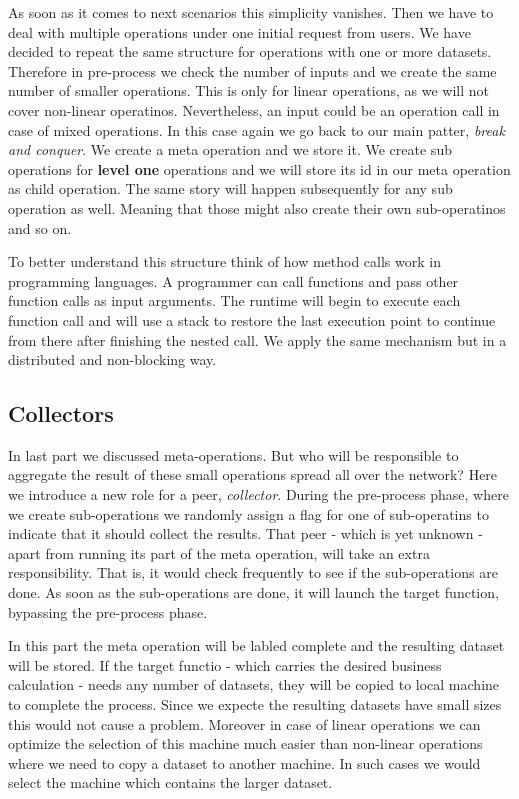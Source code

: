 As soon as it comes to next scenarios this simplicity vanishes. 
Then we have to deal with multiple operations under one initial request from users.
We have decided to repeat the same structure for operations with one or more datasets.
Therefore in pre-process we check the number of inputs and we create the same number of
smaller operations. 
This is only for linear operations, as we will not cover non-linear operatinos.
Nevertheless, an input could be an operation call in case of mixed operations.
In this case again we go back to our main patter, \textit{break and conquer}. 
We create a meta operation and we store it. 
We create sub operations for \textbf{level one} operations and we will store its id 
in our meta operation as child operation. 
The same story will happen subsequently for any sub operation as well. 
Meaning that those might also create their own sub-operatinos and so on.

To better understand this structure think of how method calls work in programming languages.
A programmer can call functions and pass other function calls as input arguments.
The runtime will begin to execute each function call and will use a stack to restore
the last execution point to continue from there after finishing the nested call.
We apply the same mechanism but in a distributed and non-blocking way.

\subsection{Collectors}
In last part we discussed meta-operations. 
But who will be responsible to aggregate the result of these small operations spread all over the network? 
Here we introduce a new role for a peer, \textit{collector}. 
During the pre-process phase, where we create sub-operations we randomly assign
a flag for one of sub-operatins to indicate that it should collect the results. 
That peer - which is yet unknown - apart from running its part of the meta operation,
will take an extra responsibility. That is, it would check frequently to see if the
sub-operations are done. As soon as the sub-operations are done, it will
launch the target function, bypassing the pre-process phase.

In this part the meta operation will be labled complete and the resulting dataset will be stored.
If the target functio - which carries the desired business calculation - needs any number of datasets,
they will be copied to local machine to complete the process. 
Since we expecte the resulting datasets have small sizes this would not cause a problem. 
Moreover in case of linear operations we can optimize the selection of this machine much easier than
non-linear operations where we need to copy a dataset to another machine. 
In such cases we would select the machine which contains the larger dataset.


